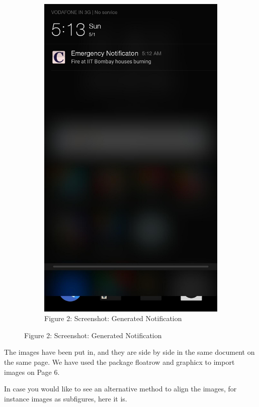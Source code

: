 \documentclass[12pt]{article}
\begin{document}
\begin{figure}[!h]
\begin{subfigure}[t]{.5\textwidth}
  \includegraphics[width=.65\linewidth]{2}
  \caption*{Figure 2: Screenshot: Generated Notification}
  \label{fig:sub2}
\end{subfigure}
\end{figure}

The images have been put in, and they are side by side in the same document
on the same page. We have used the package floatrow and graphicx to import
images on Page 6.\par
In case you would like to see an alternative method to align the images, for
instance images as subfigures, here it is.
\end{document}

